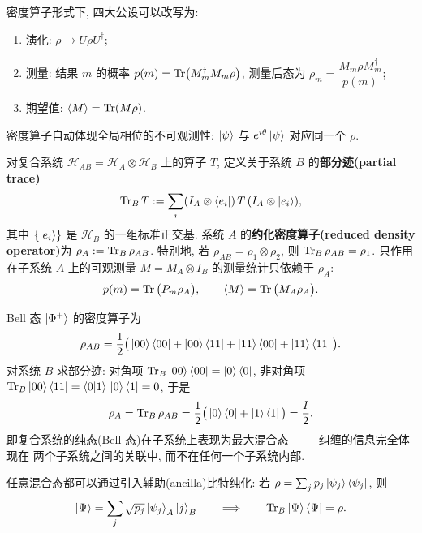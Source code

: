\documentclass[utf8]{article} %
\numberwithin{equation}{section}   %
\newtheorem{Def}{\hskip 2em {\color{green} 定义}}[subsection]
\newtheorem{Prop}{\hskip 2em {\color{cyan} 命题}}[subsection]
\newtheorem{Note}{\hskip 2em {\color{red} 注}}[subsection]
\newtheorem{Eg}{\hskip 2em {\color{black} 例}}[subsection]
\begin{document}
\begin{Prop}[密度算子形式下的公设]
    密度算子形式下, 四大公设可以改写为:
    \begin{enumerate}
        \item 演化: $\rho \to U\rho U^\dagger$;
        \item 测量: 结果 $m$ 的概率 $p(m) = \Tr(M_m^\dagger M_m \rho)$, 测量后态为
        $\rho_m = \dfrac{M_m \rho M_m^\dagger}{p(m)}$;
        \item 期望值: $\langle M \rangle = \Tr(M\rho)$.
    \end{enumerate}
    密度算子自动体现全局相位的不可观测性: $\ket{\psi}$ 与 $e^{i\theta}\ket{\psi}$ 对应同一个 $\rho$.
\end{Prop}

\begin{Def}[部分迹与约化密度算子]
    对复合系统 $\mathcal{H}_{AB} = \mathcal{H}_A \otimes \mathcal{H}_B$ 上的算子 $T$,
    定义关于系统 $B$ 的\textbf{部分迹(partial trace)}
    \begin{equation}
        \Tr_B T := \sum_i (I_A \otimes \bra{e_i})\, T\, (I_A \otimes \ket{e_i}),
    \end{equation}
    其中 $\{\ket{e_i}\}$ 是 $\mathcal{H}_B$ 的一组标准正交基.
    系统 $A$ 的\textbf{约化密度算子(reduced density operator)}为 $\rho_A := \Tr_B \rho_{AB}$.
    特别地, 若 $\rho_{AB} = \rho_1 \otimes \rho_2$, 则 $\Tr_B \rho_{AB} = \rho_1$.
    只作用在子系统 $A$ 上的可观测量 $M = M_A \otimes I_B$ 的测量统计只依赖于 $\rho_A$:
    \[ p(m) = \Tr\big(P_m \rho_A\big), \qquad \langle M \rangle = \Tr\big(M_A \rho_A\big). \]
\end{Def}

\begin{Eg}
    Bell 态 $\ket{\Phi^+}$ 的密度算子为
    \[ \rho_{AB} = \frac{1}{2}\big(\ket{00}\bra{00} + \ket{00}\bra{11} + \ket{11}\bra{00} + \ket{11}\bra{11}\big). \]
    对系统 $B$ 求部分迹: 对角项 $\Tr_B \ket{00}\bra{00} = \ket{0}\bra{0}$,
    非对角项 $\Tr_B \ket{00}\bra{11} = \braket{0}{1}\,\ket{0}\bra{1} = 0$, 于是
    \[ \rho_A = \Tr_B \rho_{AB} = \frac{1}{2}\big(\ket{0}\bra{0} + \ket{1}\bra{1}\big) = \frac{I}{2}. \]
    即复合系统的纯态(Bell 态)在子系统上表现为最大混合态 —— 纠缠的信息完全体现在
    两个子系统之间的关联中, 而不在任何一个子系统内部.
\end{Eg}

\begin{Note}[纯化]
    任意混合态都可以通过引入辅助(ancilla)比特纯化: 若 $\rho = \sum_j p_j \ket{\psi_j}\bra{\psi_j}$,
    则
    \[ \ket{\Psi} = \sum_j \sqrt{p_j}\ket{\psi_j}_A \ket{j}_B \qquad\Longrightarrow\qquad \Tr_B \ket{\Psi}\bra{\Psi} = \rho. \]
\end{Note}
\end{document}
